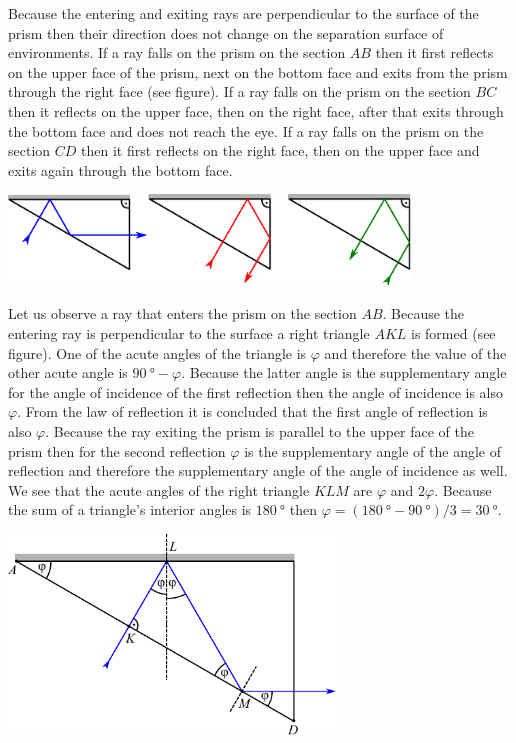 {\ifEngSolution
\osa Because the entering and exiting rays are perpendicular to the surface of the prism then their direction does not change on the separation surface of environments. If a ray falls on the prism on the section $AB$ then it first reflects on the upper face of the prism, next on the bottom face and exits from the prism through the right face (see figure). If a ray falls on the prism on the section $BC$ then it reflects on the upper face, then on the right face, after that exits through the bottom face and does not reach the eye. If a ray falls on the prism on the section $CD$ then it first reflects on the right face, then on the upper face and exits again through the bottom face. 
\begin{center}
  \includegraphics[width=0.8\textwidth]{2014-v3g-04-periskoopprillid_lahendus_joonis1}
\end{center}
\osa Let us observe a ray that enters the prism on the section $AB$. Because the entering ray is perpendicular to the surface a right triangle $AKL$ is formed (see figure). One of the acute angles of the triangle is $\varphi$ and therefore the value of the other acute angle is $\SI{90}{\degree}-\varphi$. Because the latter angle is the supplementary angle for the angle of incidence of the first reflection then the angle of incidence is also $\varphi$. From the law of reflection it is concluded that the first angle of reflection is also $\varphi$. Because the ray exiting the prism is parallel to the upper face of the prism then for the second reflection $\varphi$ is the supplementary angle of the angle of reflection and therefore the supplementary angle of the angle of incidence as well. We see that the acute angles of the right triangle $KLM$ are $\varphi$ and $2\varphi$. Because the sum of a triangle’s interior angles is $\SI{180}{\degree}$ then $\varphi=(\SI{180}{\degree}-\SI{90}{\degree})/3=\SI{30}{\degree}$.
\begin{center}
  \includegraphics[width=0.65\textwidth]{2014-v3g-04-periskoopprillid_lahendus_joonis2}

\end{center}}
